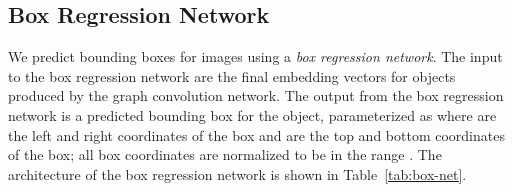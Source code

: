 \documentclass[10pt,twocolumn,letterpaper]{article}
\begin{document}
\begin{table}
  \centering
  \setlength{\tabcolsep}{1mm}
  \vspace{1mm}
  \caption{
    Architecture of the graph convolution network used to process input scene graphs.
    The input scene graph has  objects and  relationships. Due to weight sharing
    in graph convolutions, the same network can process graphs of any size or topology.
    The notation gconv() is graph convolution with input dimension
    , hidden dimension , and output dimension .
  }
  \label{tab:gconv-net}
\end{table}

\subsection{Box Regression Network}
We predict bounding boxes for images using a \emph{box regression network}. The input to the
box regression network are the final embedding vectors for objects produced by the graph
convolution network. The output from the box regression network is a predicted bounding box for
the object, parameterized as  where  are the left and right coordinates
of the box and  are the top and bottom coordinates of the box; all box coordinates are normalized
to be in the range . The architecture of the box regression network is shown in
Table~\ref{tab:box-net}.

\begin{table}
  \centering
  \setlength{\tabcolsep}{1mm}
  \vspace{1mm}
  \caption{
    Architecture of the box regression network.
  }
  \label{tab:box-net}
\end{table}
\end{document}
